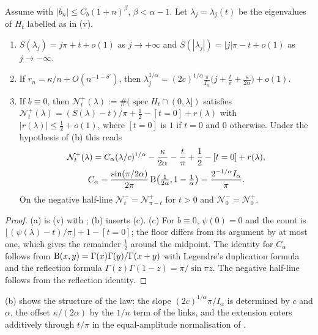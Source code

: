 \begin{corollary}\label{cor:balanced}
Assume  with $|b_n|\le C_b(1+n)^\beta$, $\beta<\alpha-1$. Let
$\lambda_j=\lambda_j(t)$ be the eigenvalues of $H_t$ labelled as in (v).
\begin{enumerate}
\item[(a)] $S(\lambda_j)=j\pi+t+o(1)$ as $j\to+\infty$ and $S(|\lambda_j|)=|j|\pi-t+o(1)$ as
  $j\to-\infty$.
\item[(b)] If $r_n=\kappa/n+O(n^{-1-\delta'})$, then
  $\lambda_j^{1/\alpha}=(2c)^{1/\alpha}\frac{\pi}{I_\alpha}\bigl(j+\frac t\pi+\frac{\kappa}{2\alpha}\bigr)+o(1)$.
\item[(c)] If $b\equiv0$, then $\mathcal N^+_t(\lambda):=\#(\operatorname{spec}H_t\cap(0,\lambda])$ satisfies
  $\mathcal N^+_t(\lambda)=(S(\lambda)-t)/\pi+\frac12-[t=0]+r(\lambda)$ with $|r(\lambda)|\le\frac12+o(1)$, where
  $[t=0]$ is $1$ if $t=0$ and $0$ otherwise.
  Under the hypothesis of (b) this reads
  \[
    \begin{gathered}
    \mathcal N^+_t(\lambda)=C_\alpha(\lambda/c)^{1/\alpha}-\frac{\kappa}{2\alpha}-\frac t\pi+\frac12-[t=0]+r(\lambda),\\
    C_\alpha=\frac{\sin(\pi/2\alpha)}{2\pi}\operatorname{B}\bigl(\tfrac1{2\alpha},1-\tfrac1\alpha\bigr)=\frac{2^{-1/\alpha}I_\alpha}{\pi}.
    \end{gathered}
  \]
  On the negative half-line $\mathcal N^-_t=\mathcal N^+_{\pi-t}$ for $t>0$ and $\mathcal N^-_0=\mathcal N^+_0$.
\end{enumerate}
\end{corollary}

\begin{proof}
(a) is (v) with ; (b) inserts (c).
(c) For $b\equiv0$, $\psi(0)=0$ and the count is $\lfloor(\psi(\lambda)-t)/\pi\rfloor+1-[t=0]$;
the floor differs from its argument by at most one, which gives the remainder
$\frac12$ around the midpoint. The identity for $C_\alpha$ follows from $\operatorname{B}(x,y)=\Gamma(x)\Gamma(y)/\Gamma(x+y)$
with Legendre's duplication formula and the reflection formula $\Gamma(z)\Gamma(1-z)=\pi/\sin\pi z$. The negative half-line follows from the reflection identity.
\end{proof}

(b) shows the structure of the law: the slope
$(2c)^{1/\alpha}\pi/I_\alpha$ is determined by $c$ and $\alpha$, the offset $\kappa/(2\alpha)$ by
the $1/n$ term of the links, and the extension enters additively through $t/\pi$ in
the equal-amplitude normalisation of .


